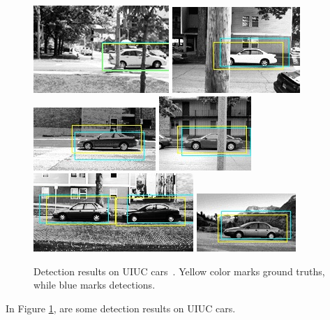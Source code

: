 \begin{figure}[!htbp]
\includegraphics[scale=0.75]{test-24_good.jpg}
\includegraphics[scale=0.75]{test-29_good.jpg}
\includegraphics[scale=0.75]{test-2_good.jpg}
\includegraphics[scale=0.75]{test-31_good.jpg}
\includegraphics[scale=0.75]{test-3_good.jpg}
\includegraphics[scale=0.75]{test-5_good.jpg}


\caption[Detection results on UIUC cars]{Detection results on UIUC cars~\citep{cds}. Yellow color marks ground truths, while blue marks detections.}
\label{fig:c5r}
\end{figure}

In Figure \ref{fig:c5r}, are some detection results on UIUC cars.


